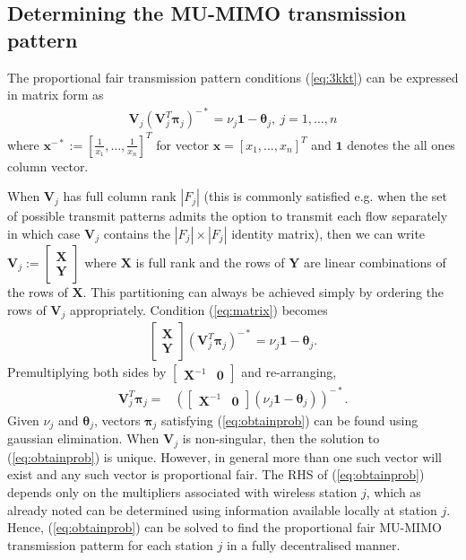 \documentclass[11pt]{amsart}
\def\m#1{\mathbf{#1}}
\begin{document}
\subsection{Determining the MU-MIMO transmission pattern}\label{sec:patterns}
The proportional fair transmission pattern conditions (\ref{eq:3kkt}) can be expressed in matrix form as
\begin{align}\label{eq:matrix}
   \m{V}_{j}  (\m{V}_j^T\boldsymbol{\pi}_j)^{-*} = \nu_j \m{1}- \boldsymbol{\theta}_{j},\ j=1,\dots, n
\end{align}
where $\m{x}^{-*}:=[\frac{1}{x_1},\dots,\frac{1}{x_n} ]^T$ for vector $\m{x}=[x_1,\dots,x_n]^T$ and $\m{1}$ denotes the all ones column vector.  

When $\m{V}_{j}$ has full column rank $|F_j|$ (this is commonly satisfied e.g. when the set of possible transmit patterns admits the option to transmit each flow separately in which case $\m{V}_{j}$ contains the $|F_j|\times |F_j|$ identity matrix), then we can write $\m{V}_{j} := \left[\begin{array}{c} \m{X} \\ \m{Y}\end{array} \right]$ where $\m{X}$ is full rank and the rows of $\m{Y}$ are linear combinations of the rows of  $\m{X}$.  This partitioning can always be achieved simply by ordering the rows of $\m{V}_{j}$ appropriately.    Condition (\ref{eq:matrix}) becomes
\begin{align}\label{eq:kkt0}
\left[\begin{array}{c} \m{X} \\ \m{Y}\end{array} \right]  (\m{V}_{j}^T \boldsymbol {\pi}_j)^{-*} = \nu_j \m{1}- \boldsymbol{\theta}_{j}.
\end{align}
Premultiplying both sides by $\left[\begin{array}{cc} \m{X}^{-1}& \m{0}\end{array} \right]$ and re-arranging,
\begin{align}
 \m{V}_{j}^T \boldsymbol {\pi}_j = & \left(\left[\begin{array}{cc} \m{X}^{-1}& \m{0}\end{array} \right]\left(\nu_j \m{1}- \boldsymbol{\theta}_{j}\right)\right)^{-*}. \label{eq:obtainprob}
\end{align}
Given $\nu_j$ and $\boldsymbol{\theta}_{j}$, vectors $\boldsymbol \pi_j$ satisfying (\ref{eq:obtainprob}) can be found using gaussian elimination.   When $\m{V}_{j}$ is non-singular, then the solution to (\ref{eq:obtainprob}) is unique.   However, in general more than one such vector will exist and any such vector is proportional fair.  The RHS of (\ref{eq:obtainprob}) depends only on the multipliers associated with wireless station $j$, which as already noted can be determined using information available locally at station $j$.  Hence, (\ref{eq:obtainprob}) can  be solved to find the proportional fair MU-MIMO transmission patterm for each station $j$ in a fully decentralised manner.
\end{document}

